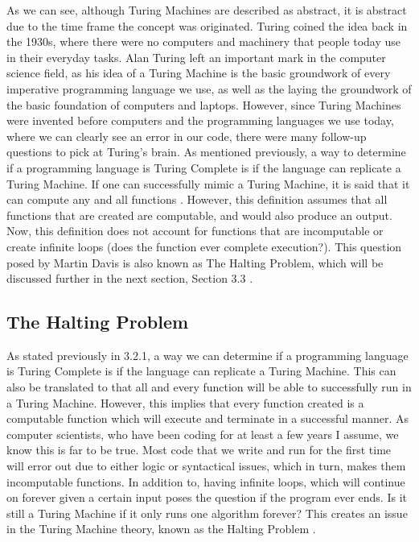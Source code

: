 \documentclass{article}
\begin{document}
  \medskip\noindent
 As we can see, although Turing Machines are described as abstract, it is abstract due to the time frame the concept was originated. Turing coined the idea back in the 1930s, where there were no computers and machinery that people today use in their everyday tasks. Alan Turing left an important mark in the computer science field, as his idea of a Turing Machine is the basic groundwork of every imperative programming language we use, as well as the laying the groundwork of the basic foundation of computers and laptops. However, since Turing Machines were invented before computers and the programming languages we use today, where we can clearly see an error in our code, there were many follow-up questions to pick at Turing's brain. As mentioned previously, a way to determine if a programming language is Turing Complete is if the language can replicate a Turing Machine. If one can successfully mimic a Turing Machine, it is said that it can compute any and all functions \cite{Turing Completeness}. However, this definition assumes that all functions that are created are computable, and would also produce an output. Now, this definition does not account for functions that are incomputable or create infinite loops (does the function ever complete execution?). This question posed by Martin Davis is also known as The Halting Problem, which will be discussed further in the next section, Section 3.3 \cite{Turing Completeness}.


\subsection{The Halting Problem}
As stated previously in 3.2.1, a way we can determine if a programming language is Turing Complete is if the language can replicate a Turing Machine. This can also be translated to that all and every function will be able to successfully run in a Turing Machine. However, this implies that every function created is a computable function which will execute and terminate in a successful manner. As computer scientists, who have been coding for at least a few years I assume, we know this is far to be true. Most code that we write and run for the first time will error out due to either logic or syntactical issues, which in turn, makes them incomputable functions. In addition to, having infinite loops, which will continue on forever given a certain input poses the question if the program ever ends. Is it still a Turing Machine if it only runs one algorithm forever? This creates an issue in the Turing Machine theory, known as the Halting Problem \cite{Turing Completeness}.
\end{document}
